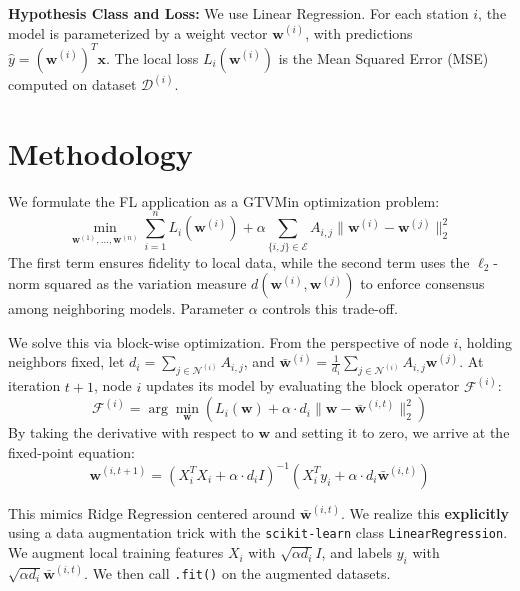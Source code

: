 \documentclass{article}
\begin{document}
\textbf{Hypothesis Class and Loss:} We use Linear Regression. For each station $i$, the model is parameterized by a weight vector $\mathbf{w}^{(i)}$, with predictions $\hat{y} = (\mathbf{w}^{(i)})^T \mathbf{x}$. The local loss $L_i(\mathbf{w}^{(i)})$ is the Mean Squared Error (MSE) computed on dataset $\mathcal{D}^{(i)}$.

\section{Methodology}
\label{sec:meth}

We formulate the FL application as a GTVMin optimization problem:
\begin{equation}
\min_{\mathbf{w}^{(1)},\ldots,\mathbf{w}^{(n)}} \sum_{i=1}^{n} L_i(\mathbf{w}^{(i)}) + \alpha \sum_{\{i,j\} \in \mathcal{E}} A_{i,j} \|\mathbf{w}^{(i)} - \mathbf{w}^{(j)}\|_2^2
\label{eq:gtvmin}
\end{equation}
The first term ensures fidelity to local data, while the second term uses the $\ell_2$-norm squared as the variation measure $d(\mathbf{w}^{(i)}, \mathbf{w}^{(j)})$ to enforce consensus among neighboring models. Parameter $\alpha$ controls this trade-off.

We solve this via block-wise optimization. From the perspective of node $i$, holding neighbors fixed, let $d_i = \sum_{j \in \mathcal{N}^{(i)}} A_{i,j}$, and $\mathbf{\bar{w}}^{(i)} = \frac{1}{d_i} \sum_{j \in \mathcal{N}^{(i)}} A_{i,j} \mathbf{w}^{(j)}$.
At iteration $t+1$, node $i$ updates its model by evaluating the block operator $\mathcal{F}^{(i)}$:
\begin{equation}
\mathcal{F}^{(i)} = \arg\min_{\mathbf{w}} \left( L_i(\mathbf{w}) + \alpha \cdot d_i \|\mathbf{w} - \mathbf{\bar{w}}^{(i, t)}\|_2^2 \right)
\label{eq:blockop}
\end{equation}
By taking the derivative with respect to $\mathbf{w}$ and setting it to zero, we arrive at the fixed-point equation:
\begin{equation}
\mathbf{w}^{(i, t+1)} = \left( X_i^T X_i + \alpha \cdot d_i I \right)^{-1} \left( X_i^T y_i + \alpha \cdot d_i \mathbf{\bar{w}}^{(i, t)} \right)
\end{equation}

This mimics Ridge Regression centered around $\mathbf{\bar{w}}^{(i, t)}$. We realize this \textbf{explicitly} using a data augmentation trick with the \texttt{scikit-learn} \cite{pedregosa2011scikit} class \texttt{LinearRegression}. We augment local training features $X_i$ with $\sqrt{\alpha d_i} I$, and labels $y_i$ with $\sqrt{\alpha d_i} \mathbf{\bar{w}}^{(i,t)}$. We then call \texttt{.fit()} on the augmented datasets.
\end{document}
